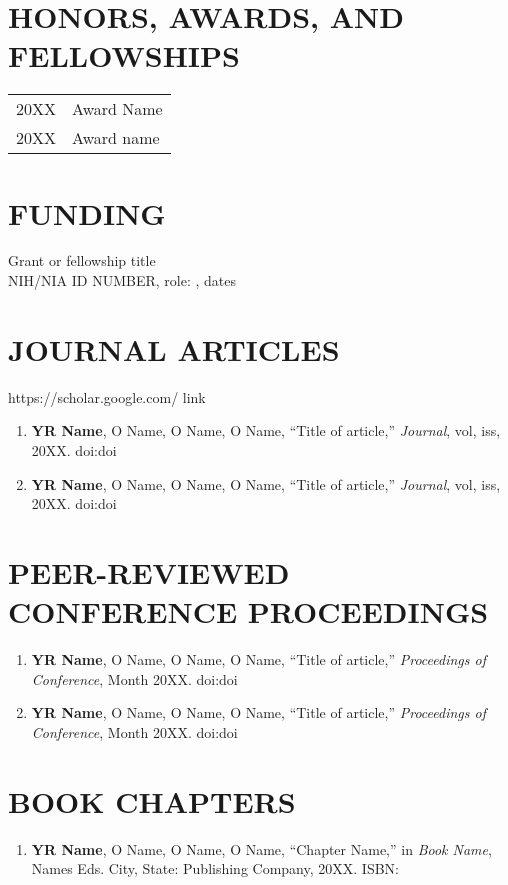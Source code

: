 \documentclass[line,10pt]{res}
\begin{document}
\begin{resume}
\section{\bf HONORS, AWARDS, AND FELLOWSHIPS}
\vspace{1em}
\begin{tabular}{p{1.0in} p{5.5in}}
20XX & Award Name \\
20XX & Award name
\end{tabular}

\section{\bf FUNDING}
\vspace{1em}
Grant or fellowship title\\ 
NIH/NIA ID NUMBER, role: , dates


\section{\bf JOURNAL ARTICLES}
\vspace{0.5em}
https://scholar.google.com/ link
\vspace{1em}
\begin{enumerate}
    \setlength\itemsep{0.8em}
    \item \textbf{YR Name}, O Name, O Name, O Name, ``Title of article,'' \textit{Journal}, vol, iss, 20XX. doi:doi
    \item \textbf{YR Name}, O Name, O Name, O Name, ``Title of article,'' \textit{Journal}, vol, iss, 20XX. doi:doi
\end{enumerate}

\section{\bf PEER-REVIEWED CONFERENCE PROCEEDINGS}
\vspace{1em}\null
\begin{enumerate}
    \setlength\itemsep{0.8em}
    \item \textbf{YR Name}, O Name, O Name, O Name, ``Title of article,'' \textit{Proceedings of Conference}, Month 20XX. doi:doi
    \item \textbf{YR Name}, O Name, O Name, O Name, ``Title of article,'' \textit{Proceedings of Conference}, Month 20XX. doi:doi
\end{enumerate}

\section{\bf BOOK CHAPTERS}
\vspace{1em}\null
\begin{enumerate}
    \setlength\itemsep{0.8em}
    \item \textbf{YR Name}, O Name, O Name, O Name, ``Chapter Name,'' in \textit{Book Name}, Names Eds. City, State: Publishing Company, 20XX. ISBN: 
\end{enumerate}


\end{resume}
\end{document}
